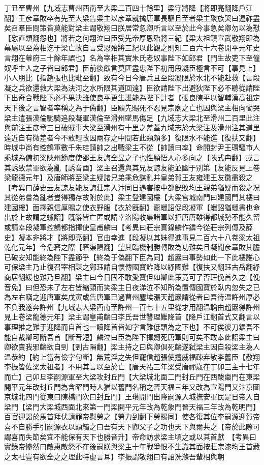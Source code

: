 丁丑至曹州【九域志曹州西南至大梁二百四十餘里】梁守將降【將即亮翻降戶江翻】王彦章敗卒有先至大梁告梁主以彦章就擒唐軍長驅且至者梁主聚族哭曰運祚盡矣召羣臣問策皆莫能對梁主謂敬翔曰朕居常忽卿所言以至於此今事急矣卿勿以為懟【懟直類翻怨也】將若之何翔泣曰臣受先帝厚恩殆將三紀【梁太祖鎮宣武敬翔即為幕屬以至為相汔于梁亡故自言受恩殆將三紀以此觀之則知二百六十六卷開平元年史言翔在幕府三十餘年誤也】名為宰相其實朱氏老奴事陛下如郎君【門生故吏下至僮奴呼主人之子皆曰郎君】臣前後獻言莫匪盡忠陛下初用段凝臣極言不可【事見上】小人朋比【指趙張也比毗至翻】致有今日今唐兵且至段凝限於水北不能赴救【言段凝之兵欲還救大梁為決河之水所限其道回遠】臣欲請陛下出避狄陛下必不聽從請陛下出奇合戰陛下必不果決雖使良平更生誰能為陛下計者【張良陳平以智輔漢高祖定天下後之言智者率稱之為于偽翻】臣願先賜死不忍見宗廟之亡也因與梁主相向慟哭梁主遣張漢倫馳騎追段凝軍漢倫至滑州墜馬傷足【九域志大梁北至滑州二百里此注與前注王彦章三日破賊事大梁至滑州有十里之差蓋九域志於大梁注及滑州注其道里遠近自有微差者今不敢輕改因兩存之中間若此類頗多】復限水不能進【復扶又翻】時城中尚有控鶴軍數千朱珪請帥之出戰梁主不從【帥讀曰率】命開封尹王瓚驅市人乘城為備初梁陜州節度使邵王友誨全昱之子也性頴悟人心多向之【陜式冉翻】或言其誘致禁軍欲為亂【誘音酉】梁主召還與其兄友諒友能並幽于别第【友能反見上卷梁龍德元年】及唐師將至梁主疑諸兄弟乘危謀亂并皇弟賀王友雍建王友徽盡殺之　【考異曰薛史云友諒友能友誨莊宗入汴同日遇害按中都旣敗均王親弟猶疑而殺之况其從弟嘗為亂者豈得獨存故附於此】梁主登建國樓【大梁宫城南門曰建國門其樓曰建國樓】面擇親信厚賜之使衣野服【衣於旣翻】齎蠟詔促段凝軍【蠟詔猶蠟書也命出於上故謂之蠟詔】旣辭皆亡匿或請幸洛陽收集諸軍以拒唐唐雖得都城勢不能久留或請幸段凝軍控鶴都指揮使皇甫麟曰【考異曰莊宗實錄麟作鏻今從莊宗列傳及薛史】凝本非將才【將即亮翻】官由幸進【段凝以其妹得進事見二百六十八卷梁太祖乾化元年】今危窘之際【窘渠隕翻】望其臨機制勝轉敗為功難矣且凝聞彦章敗其膽已破安知能終為陛下盡節乎【終為于偽翻下臣為同】趙巖曰事勢如此一下此樓誰心可保梁主乃止復召宰相謀之鄭珏請自懷傳國寶詐降以紓國難【復扶又翻珏古岳翻紓商居翻緩也難乃旦翻】梁主曰今日固不敢愛寶但如卿此策竟可了否珏俛首久之【俛音免】曰但恐未了左右皆縮頸而笑梁主日夜涕泣不知所為置傳國寶於臥内忽失之已為左右竊之迎唐軍矣戊寅或告唐軍已過曹州塵埃漲天趙巖謂從者曰吾待温許州厚必不負我遂奔許州【九域志大梁西南至許州一百七十五里從才用翻温韜由趙巖得許州見上卷梁龍德元年】梁主謂皇甫麟曰李氏吾世讐理難降首【降戶江翻首式又翻言以事理推之難于迎降而自首也一讀降首皆如字言難低頭為之下也】不可俟彼刀鋸吾不能自裁卿可斷吾首【斷音短】麟泣曰臣為陛下揮劒死唐軍則可矣不敢奉此詔梁主曰卿欲賣我邪麟欲自剄【剄古隕翻】梁主持之曰與卿俱死麟遂弑梁主因自殺梁主為人温恭約【約上當有儉字句斷】無荒淫之失但寵信趙張使擅威福疎弃敬李舊臣【敬翔李振皆佐梁太祖者】不用其言以至於亡【唐天祐三年梁受唐禪歲在丁卯三主十七年而亡】己卯旦李嗣源軍至大梁攻封丘門【大梁城北面二門封丘門在西酸棗門在東梁開平元年改封丘門為含曜門時人猶以舊門名稱之晉天福三年又改為宣陽門又汴京圖京城北四門從東曰陳橋門次曰封丘門】王瓚開門出降嗣源入城撫安軍民是日帝入自梁門【梁門大梁城西面北來第一門梁開平元年改為乾象門晉天福三年改為乾明門】百官迎謁於馬首拜伏請罪帝慰勞之【勞力到翻下勞賜同】使各復其位李嗣源迎賀帝喜不自勝手引嗣源衣以頭觸之曰吾有天下卿父子之功也天下與爾共之【帝於此際可謂喜而失節矣宜不能保有天下也勝音升】帝命訪求梁主頃之或以其首獻　【考異曰實錄帝慘然曰敵惠敵怨不在後嗣朕與梁主十年戰爭恨不生識其面按莊宗漆均王首藏之太社豈有欲全之之理此特虚言耳】李振謂敬翔曰有詔洗滌吾輩相與朝